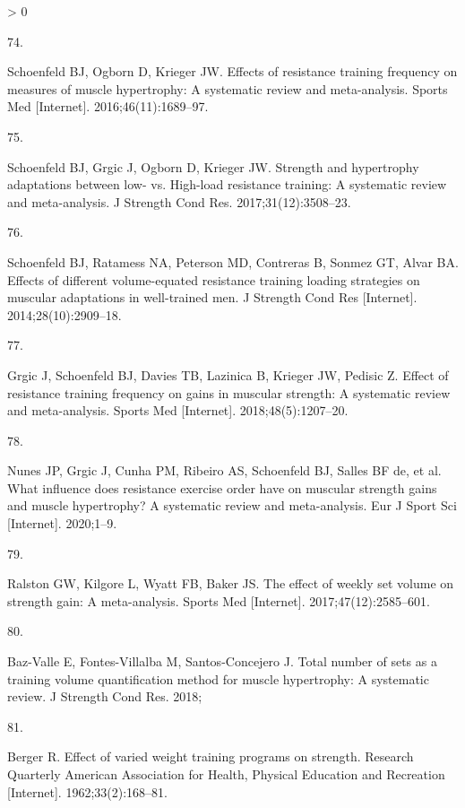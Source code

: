 \documentclass[twoside,10pt]{gihclass} %
\newlength{\cslhangindent}
\newlength{\csllabelwidth}
\newenvironment{CSLReferences}[3] %
 {%
  \setlength{\parindent}{0pt}
  \ifodd #1 \everypar{\setlength{\hangindent}{\cslhangindent}}\ignorespaces\fi
  \ifnum #2 > 0
  \setlength{\parskip}{#2\baselineskip}
  \fi
 }%
 {}
\newcommand{\CSLLeftMargin}[1]{\parbox[t]{\maxof{\widthof{#1}}{\csllabelwidth}}{#1}}
\newcommand{\CSLRightInline}[1]{\parbox[t]{\linewidth}{#1}}
\begin{document}
\begin{CSLReferences}{0}{0}
\leavevmode\hypertarget{ref-RN2571}{}%
\CSLLeftMargin{74. }
\CSLRightInline{Schoenfeld BJ, Ogborn D, Krieger JW. Effects of resistance training frequency on measures of muscle hypertrophy: A systematic review and meta-analysis. Sports Med {[}Internet{]}. 2016;46(11):1689--97. }

\leavevmode\hypertarget{ref-RN2569}{}%
\CSLLeftMargin{75. }
\CSLRightInline{Schoenfeld BJ, Grgic J, Ogborn D, Krieger JW. Strength and hypertrophy adaptations between low- vs. High-load resistance training: A systematic review and meta-analysis. J Strength Cond Res. 2017;31(12):3508--23. }

\leavevmode\hypertarget{ref-RN1612}{}%
\CSLLeftMargin{76. }
\CSLRightInline{Schoenfeld BJ, Ratamess NA, Peterson MD, Contreras B, Sonmez GT, Alvar BA. Effects of different volume-equated resistance training loading strategies on muscular adaptations in well-trained men. J Strength Cond Res {[}Internet{]}. 2014;28(10):2909--18. }

\leavevmode\hypertarget{ref-RN2570}{}%
\CSLLeftMargin{77. }
\CSLRightInline{Grgic J, Schoenfeld BJ, Davies TB, Lazinica B, Krieger JW, Pedisic Z. Effect of resistance training frequency on gains in muscular strength: A systematic review and meta-analysis. Sports Med {[}Internet{]}. 2018;48(5):1207--20. }

\leavevmode\hypertarget{ref-RN2591}{}%
\CSLLeftMargin{78. }
\CSLRightInline{Nunes JP, Grgic J, Cunha PM, Ribeiro AS, Schoenfeld BJ, Salles BF de, et al. What influence does resistance exercise order have on muscular strength gains and muscle hypertrophy? A systematic review and meta-analysis. Eur J Sport Sci {[}Internet{]}. 2020;1--9. }

\leavevmode\hypertarget{ref-RN2492}{}%
\CSLLeftMargin{79. }
\CSLRightInline{Ralston GW, Kilgore L, Wyatt FB, Baker JS. The effect of weekly set volume on strength gain: A meta-analysis. Sports Med {[}Internet{]}. 2017;47(12):2585--601. }

\leavevmode\hypertarget{ref-RN2130}{}%
\CSLLeftMargin{80. }
\CSLRightInline{Baz-Valle E, Fontes-Villalba M, Santos-Concejero J. Total number of sets as a training volume quantification method for muscle hypertrophy: A systematic review. J Strength Cond Res. 2018; }

\leavevmode\hypertarget{ref-RN1476}{}%
\CSLLeftMargin{81. }
\CSLRightInline{Berger R. Effect of varied weight training programs on strength. Research Quarterly American Association for Health, Physical Education and Recreation {[}Internet{]}. 1962;33(2):168--81. }


\end{CSLReferences}
\end{document}
